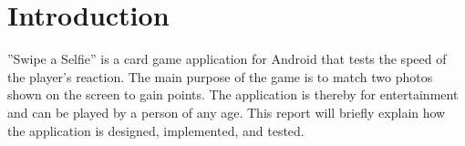 \section{Introduction}
''Swipe a Selfie'' is a card game application for Android that tests the speed of the player's reaction. The main purpose of the game is to match two photos shown on the screen to gain points. The application is thereby for entertainment and can be played by a person of any age. This report will briefly explain how the application is designed, implemented, and tested.
